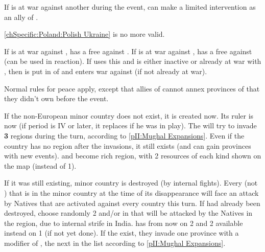 \phadm
\aparag If \POL is at war against another \MAJ during the event, \HAB can make
a limited intervention as an ally of \POL.

\effetlong
\aparag \ref{chSpecific:Poland:Polish Ukraine} is no more valid.


\phevnt
\aparag If \POL is at war against \paysukraine, \SUE has a free \CB against
\POL.
\bparag If \SUE is at war against \POL, \RUS has a free \CB against \SUE (can
be used in reaction).
\bparag If \RUS uses this \CB and \paysdanemark is either inactive or already
at war with \SUE, then \paysdanemark is put in \EG of \RUS and enters war
against \SUE (if not already at war).

\phpaix
\aparag Normal rules for peace apply, except that allies of \POL cannot annex
provinces of \paysukraine that they didn't own before the event.





\phevnt
\aparag If the non-European minor country \paysMogol does not exist, it is
created now. Its ruler is now  (if period is IV or later,
it replaces \leaderAkbar if he was in play).
\aparag The \paysMogol will try to invade \textbf{3} regions during the turn,
according to \ref{pII:Mughal Expansions}.
\aparag Even if the country has no region after the invasions, it still exists
(and can gain provinces with new events).
\aparag \granderegionBengale and \granderegionKarnatika become rich region,
with 2 resources of each kind shown on the map (instead of 1).





\phevnt
\aparag If it was still existing, minor country \paysVijayanagar is destroyed
(by internal fights).  Every \TP (not \COL) that is in the minor country
\paysVijayanagar at the time of its disappearance will face an attack by
Natives that are activated against every country this turn.
\aparag If \paysVijayanagar had already been destroyed, choose randomly 2 \TP
and/or \COL in  that will be attacked by the Natives in the
region, due to internal strife in India.
\aparag \granderegionKarnatika has from now on 2  and 2
 available instead on 1 (if not yet done).
\aparag If the \paysMogol exist, they invade one province with a modifier of
, the next in the list according to \ref{pII:Mughal Expansions}.



